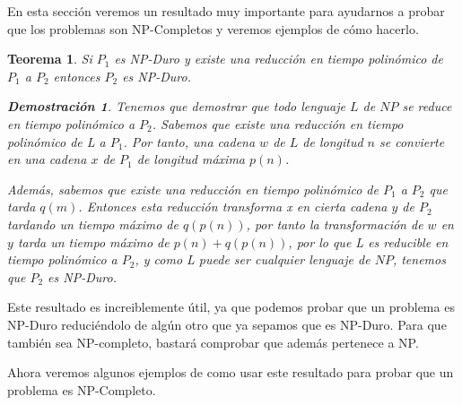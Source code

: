 \documentclass[a4paper,12pt,titlepage]{article}
\newtheorem{teo}{Teorema}[section]
\newtheorem*{dem}{\textbf{Demostraci\'on}}
\begin{document}
En esta secci\'on veremos un resultado muy importante para ayudarnos a probar que los problemas son NP-Completos y veremos ejemplos de c\'omo hacerlo.

\begin{teo}

Si $P_{1}$ es NP-Duro y existe una reducci\'on en tiempo polin\'omico de $P_{1}$ a $P_2$ entonces $P_2$ es NP-Duro.

\begin{dem}

Tenemos que demostrar que todo lenguaje $L$ de $NP$ se reduce en tiempo polin\'omico a $P_2$. Sabemos que existe una reducci\'on en tiempo polin\'omico de L a $P_1$. Por tanto, una cadena $w$ de $L$ de longitud $n$ se convierte en una cadena $x$ de $P_1$ de longitud m\'axima $p(n)$.

Adem\'as, sabemos que existe una reducci\'on en tiempo polin\'omico de $P_1$ a $P_2$ que tarda $q(m)$. Entonces esta reducci\'on transforma x en cierta cadena $y$ de $P_2$ tardando un tiempo m\'aximo de $q(p(n))$, por tanto la transformaci\'on de $w$ en $y$ tarda un tiempo m\'aximo de $p(n) + q(p(n))$, por lo que L es reducible en tiempo polin\'omico a $P_2$, y como L puede ser cualquier lenguaje de $NP$, tenemos que $P_2$ es NP-Duro.

\end{dem}

\end{teo}

Este resultado es increiblemente \'util, ya que podemos probar que un problema es NP-Duro reduci\'endolo de alg\'un otro que ya sepamos que es NP-Duro.
Para que tambi\'en sea NP-completo, bastar\'a comprobar que adem\'as pertenece a NP.

Ahora veremos algunos ejemplos de como usar este resultado para probar que un problema es NP-Completo.
\end{document}
